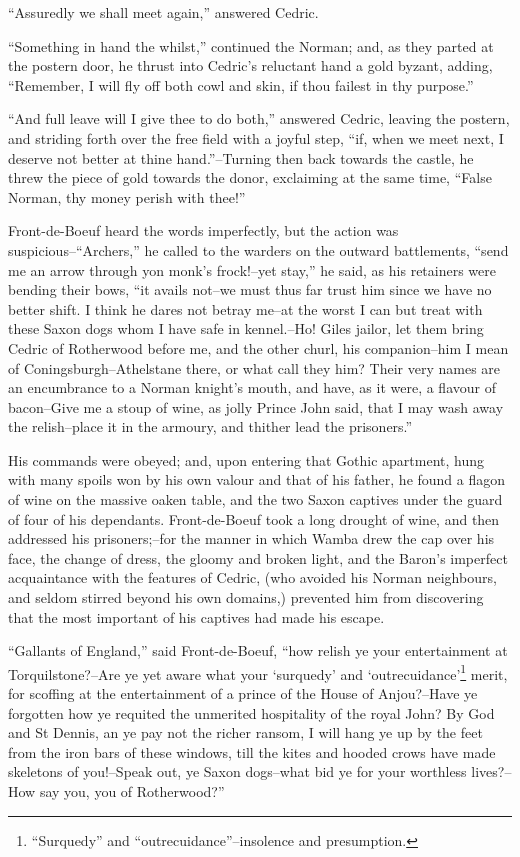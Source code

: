 ``Assuredly we shall meet again,'' answered Cedric.

``Something in hand the whilst,'' continued the Norman; and, as they
parted at the postern door, he thrust into Cedric's reluctant hand a
gold byzant, adding, ``Remember, I will fly off both cowl and skin, if
thou failest in thy purpose.''

``And full leave will I give thee to do both,'' answered Cedric, leaving
the postern, and striding forth over the free field with a joyful step,
``if, when we meet next, I deserve not better at thine hand.''--Turning
then back towards the castle, he threw the piece of gold towards the
donor, exclaiming at the same time, ``False Norman, thy money perish
with thee!''

Front-de-Boeuf heard the words imperfectly, but the action was
suspicious--``Archers,'' he called to the warders on the outward
battlements, ``send me an arrow through yon monk's frock!--yet stay,''
he said, as his retainers were bending their bows, ``it avails not--we
must thus far trust him since we have no better shift. I think he dares
not betray me--at the worst I can but treat with these Saxon dogs whom I
have safe in kennel.--Ho! Giles jailor, let them bring Cedric of
Rotherwood before me, and the other churl, his companion--him I mean of
Coningsburgh--Athelstane there, or what call they him? Their very names
are an encumbrance to a Norman knight's mouth, and have, as it were, a
flavour of bacon--Give me a stoup of wine, as jolly Prince John said,
that I may wash away the relish--place it in the armoury, and thither
lead the prisoners.''

His commands were obeyed; and, upon entering that Gothic apartment, hung
with many spoils won by his own valour and that of his father, he found
a flagon of wine on the massive oaken table, and the two Saxon captives
under the guard of four of his dependants. Front-de-Boeuf took a long
drought of wine, and then addressed his prisoners;--for the manner in
which Wamba drew the cap over his face, the change of dress, the gloomy
and broken light, and the Baron's imperfect acquaintance with the
features of Cedric, (who avoided his Norman neighbours, and seldom
stirred beyond his own domains,) prevented him from discovering that the
most important of his captives had made his escape.

``Gallants of England,'' said Front-de-Boeuf, ``how relish ye your
entertainment at Torquilstone?--Are ye yet aware what your `surquedy'
and `outrecuidance'\footnote{``Surquedy'' and ``outrecuidance''--insolence
and presumption.} merit, for scoffing at the entertainment of
a prince of the House of Anjou?--Have ye forgotten how ye requited the
unmerited hospitality of the royal John? By God and St Dennis, an ye pay
not the richer ransom, I will hang ye up by the feet from the iron bars
of these windows, till the kites and hooded crows have made skeletons of
you!--Speak out, ye Saxon dogs--what bid ye for your worthless
lives?--How say you, you of Rotherwood?''

